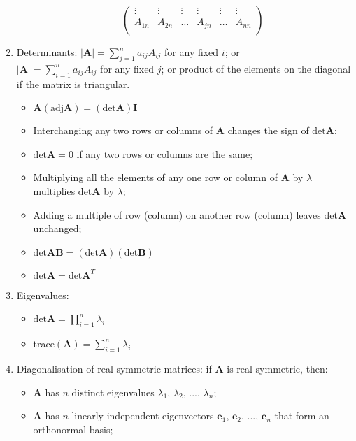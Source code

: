 \documentclass[fleqn]{article}
\begin{document}
\begin{enumerate}
\begin{itemize}[label={--}, topsep=0pt]
\[\begin{pmatrix}
                    \vdots & \vdots & \vdots & \vdots & \vdots & \vdots\\
                    A_{1n} & A_{2n} & \dots  & A_{jn} & \dots  & A_{nn}\\
                \end{pmatrix}\]
        \end{itemize}
    \item Determinants:\smallbreak
        $|\bm{A}|=\displaystyle\sum_{j=1}^n a_{ij}A_{ij}$ for any fixed $i$; or\\
        $|\bm{A}|=\displaystyle\sum_{i=1}^n a_{ij}A_{ij}$ for any fixed $j$; or\smallbreak
        product of the elements on the diagonal if the matrix is triangular.
        \begin{itemize}[label={--}, topsep=0pt]
            \item $\bm{A}(\text{adj}\bm{A})=(\text{det}\bm{A})\bm{I}$
            \item Interchanging any two rows or columns of $\bm{A}$ changes the sign of $\text{det}\bm{A}$;
            \item $\text{det}\bm{A}=0$ if any two rows or columns are the same;
            \item Multiplying all the elements of any one row or column of $\bm{A}$ by $\lambda$ multiplies $\text{det}\bm{A}$ by $\lambda$;
            \item Adding a multiple of row (column) on another row (column) leaves $\text{det}\bm{A}$ unchanged;
            \item $\text{det}\bm{AB}=(\text{det}\bm{A})(\text{det}\bm{B})$
            \item $\text{det}\bm{A}=\text{det}\bm{A}^T$
        \end{itemize}
    \item Eigenvalues:
        \begin{itemize}[label={--}, topsep=0pt]
            \item $\text{det}\bm{A}=\displaystyle\prod_{i=1}^n \lambda_i$
            \item trace$(\bm{A})=\displaystyle\sum_{i=1}^n \lambda_i$
        \end{itemize}
    \item Diagonalisation of real symmetric matrices: if $\bm{A}$ is real symmetric, then:
        \begin{itemize}[label={--}, topsep=0pt]
            \item $\bm{A}$ has $n$ distinct eigenvalues $\lambda_1$, $\lambda_2$, ..., $\lambda_n$;
            \item $\bm{A}$ has $n$ linearly independent eigenvectors $\bm{e}_1$, $\bm{e}_2$, ..., $\bm{e}_n$ that form an orthonormal basis;

\end{itemize}
\end{enumerate}
\end{document}
